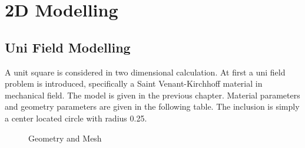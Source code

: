 \section{2D Modelling}
\subsection{Uni Field Modelling}
A unit square is considered in two dimensional calculation. At first a uni field problem is introduced, specifically a Saint Venant-Kirchhoff material in mechanical field. The model is given in the previous chapter. Material parameters and geometry parameters are given in the following table. The inclusion is simply a center located circle with radius 0.25. \\

\begin{figure}[h]
  \centering
  \caption{Geometry and Mesh}
  \label{fig: inc}
\end{figure} 

